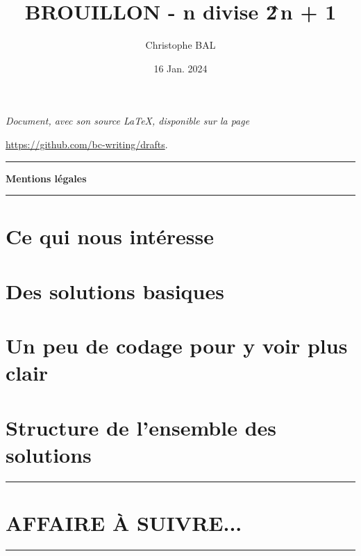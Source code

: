 \documentclass[12pt]{amsart}
\newcommand\contentdir{\jobname}
\begin{document}
\title{BROUILLON - n divise 2\^\,\!n + 1}
\author{Christophe BAL}
\date{16 Jan. 2024}

\maketitle

\begin{center}
	\itshape
	Document, avec son source \LaTeX, disponible sur la page
	
	\url{https://github.com/bc-writing/drafts}.
\end{center}


\bigskip


\begin{center}
	\hrule\vspace{.3em}
	{
		\fontsize{1.35em}{1em}\selectfont
		\textbf{Mentions \og légales \fg}
	}
			
	\vspace{0.45em}
	\doclicenseThis
	\hrule
\end{center}


\setcounter{tocdepth}{2}
\tableofcontents


\newpage
\section{Ce qui nous intéresse}




\section{Des solutions basiques}




\section{Un peu de codage pour y voir plus clair}




\section{Structure de l'ensemble des solutions}




\bigskip

\hrule

\section{AFFAIRE À SUIVRE...}

\bigskip

\hrule




%
%
\end{document}
